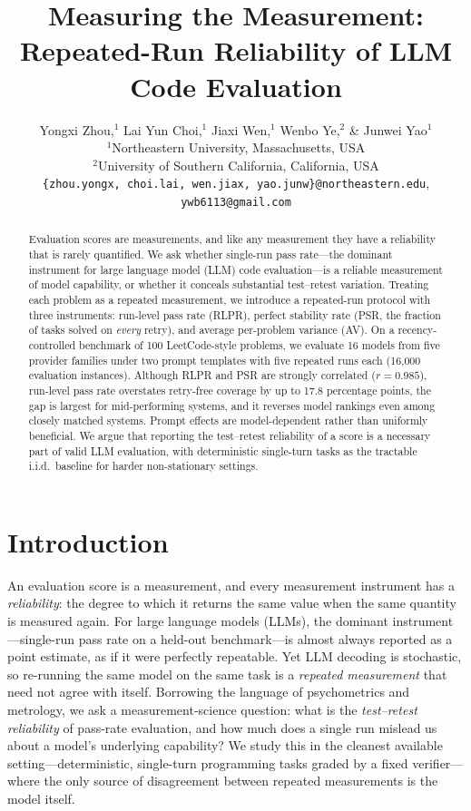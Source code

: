 \documentclass{article}
\title{Measuring the Measurement: Repeated-Run Reliability of LLM Code Evaluation}
\author{Yongxi Zhou,$^{1}$ Lai Yun Choi,$^{1}$ Jiaxi Wen,$^{1}$ Wenbo Ye,$^{2}$ \& Junwei Yao$^{1}$ \\
  $^{1}$Northeastern University, Massachusetts, USA \\
  $^{2}$University of Southern California, California, USA \\
  \texttt{\{zhou.yongx, choi.lai, wen.jiax, yao.junw\}@northeastern.edu}, \texttt{ywb6113@gmail.com}}
\begin{document}
\ifcolmsubmission
\linenumbers
\fi

\maketitle

\begin{abstract}
Evaluation scores are measurements, and like any measurement they have a reliability that is rarely quantified. We ask whether single-run pass rate---the dominant instrument for large language model (LLM) code evaluation---is a reliable measurement of model capability, or whether it conceals substantial test--retest variation. Treating each problem as a repeated measurement, we introduce a repeated-run protocol with three instruments: run-level pass rate (RLPR), perfect stability rate (PSR, the fraction of tasks solved on \emph{every} retry), and average per-problem variance (AV). On a recency-controlled benchmark of 100 LeetCode-style problems, we evaluate 16 models from five provider families under two prompt templates with five repeated runs each (16{,}000 evaluation instances). Although RLPR and PSR are strongly correlated ($r=0.985$), run-level pass rate overstates retry-free coverage by up to 17.8 percentage points, the gap is largest for mid-performing systems, and it reverses model rankings even among closely matched systems. Prompt effects are model-dependent rather than uniformly beneficial. We argue that reporting the test--retest reliability of a score is a necessary part of valid LLM evaluation, with deterministic single-turn tasks as the tractable i.i.d.\ baseline for harder non-stationary settings.
\end{abstract}

\section{Introduction}
An evaluation score is a measurement, and every measurement instrument has a \emph{reliability}: the degree to which it returns the same value when the same quantity is measured again. For large language models (LLMs), the dominant instrument---single-run pass rate on a held-out benchmark---is almost always reported as a point estimate, as if it were perfectly repeatable. Yet LLM decoding is stochastic, so re-running the same model on the same task is a \emph{repeated measurement} that need not agree with itself. Borrowing the language of psychometrics and metrology, we ask a measurement-science question: what is the \emph{test--retest reliability} of pass-rate evaluation, and how much does a single run mislead us about a model's underlying capability? We study this in the cleanest available setting---deterministic, single-turn programming tasks graded by a fixed verifier---where the only source of disagreement between repeated measurements is the model itself.
\end{document}
